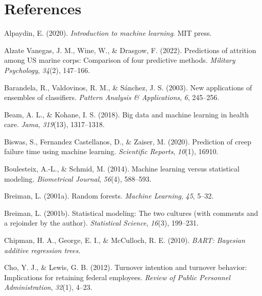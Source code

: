 \documentclass[
  jou]{apa6}
\newlength{\cslhangindent}
\newlength{\cslentryspacingunit} %
\newenvironment{CSLReferences}[2] %
 {%
  \setlength{\parindent}{0pt}
  \ifodd #1
  \let\oldpar\par
  \def\par{\hangindent=\cslhangindent\oldpar}
  \fi
  \setlength{\parskip}{#2\cslentryspacingunit}
 }%
 {}
\begin{document}
\newpage

\hypertarget{references}{%
\section{References}\label{references}}

\hypertarget{refs}{}
\begin{CSLReferences}{1}{0}
\leavevmode{}%
Alpaydin, E. (2020). \emph{Introduction to machine learning}. MIT press.

\leavevmode{}%
Alzate Vanegas, J. M., Wine, W., \& Drasgow, F. (2022). Predictions of attrition among US marine corps: Comparison of four predictive methods. \emph{Military Psychology}, \emph{34}(2), 147--166.

\leavevmode{}%
Barandela, R., Valdovinos, R. M., \& Sánchez, J. S. (2003). New applications of ensembles of classifiers. \emph{Pattern Analysis \& Applications}, \emph{6}, 245--256.

\leavevmode{}%
Beam, A. L., \& Kohane, I. S. (2018). Big data and machine learning in health care. \emph{Jama}, \emph{319}(13), 1317--1318.

\leavevmode{}%
Biswas, S., Fernandez Castellanos, D., \& Zaiser, M. (2020). Prediction of creep failure time using machine learning. \emph{Scientific Reports}, \emph{10}(1), 16910.

\leavevmode{}%
Boulesteix, A.-L., \& Schmid, M. (2014). Machine learning versus statistical modeling. \emph{Biometrical Journal}, \emph{56}(4), 588--593.

\leavevmode{}%
Breiman, L. (2001a). Random forests. \emph{Machine Learning}, \emph{45}, 5--32.

\leavevmode{}%
Breiman, L. (2001b). Statistical modeling: The two cultures (with comments and a rejoinder by the author). \emph{Statistical Science}, \emph{16}(3), 199--231.

\leavevmode{}%
Chipman, H. A., George, E. I., \& McCulloch, R. E. (2010). \emph{BART: Bayesian additive regression trees}.

\leavevmode{}%
Cho, Y. J., \& Lewis, G. B. (2012). Turnover intention and turnover behavior: Implications for retaining federal employees. \emph{Review of Public Personnel Administration}, \emph{32}(1), 4--23.


\end{CSLReferences}
\end{document}

